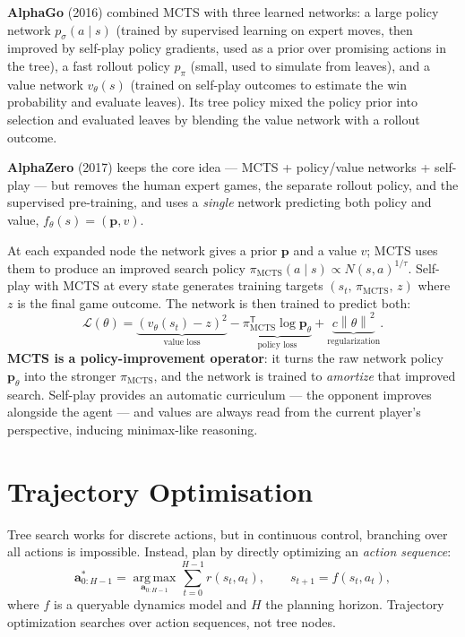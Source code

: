 \documentclass[11pt, oneside]{book}
\newcommand{\argmax}{\operatorname*{arg\,max}}
\newcommand{\norm}[1]{\left\lVert #1 \right\rVert}
\newcommand{\T}{^{\mathsf{T}}}           %
\newcommand{\loss}{\mathcal{L}}          %
\newcommand{\params}{\boldsymbol{\theta}}   %
\begin{document}
\textbf{AlphaGo} (2016) combined MCTS with three learned networks: a large policy network
$p_\sigma(a\mid s)$ (trained by supervised learning on expert moves, then improved by
self-play policy gradients, used as a prior over promising actions in the tree), a fast
rollout policy $p_\pi$ (small, used to simulate from leaves), and a value network
$v_\theta(s)$ (trained on self-play outcomes to estimate the win probability and evaluate
leaves). Its tree policy mixed the policy prior into selection and evaluated leaves by
blending the value network with a rollout outcome.

\textbf{AlphaZero} (2017) keeps the core idea --- MCTS + policy/value networks + self-play
--- but removes the human expert games, the separate rollout policy, and the supervised
pre-training, and uses a \emph{single} network predicting both policy and value,
$f_\theta(s) = (\mathbf{p}, v)$.

\begin{intbox}[title={Search improves the policy; learning amortizes search}]
At each expanded node the network gives a prior $\mathbf{p}$ and a value $v$; MCTS uses them
to produce an improved search policy $\pi_{\text{MCTS}}(a\mid s) \propto N(s,a)^{1/\tau}$.
Self-play with MCTS at every state generates training targets $(s_t,\, \pi_{\text{MCTS}},\, z)$
where $z$ is the final game outcome. The network is then trained to predict both:
\[
  \loss(\theta) = \underbrace{(v_\theta(s_t) - z)^2}_{\text{value loss}}
  - \underbrace{\pi_{\text{MCTS}}\T \log \mathbf{p}_\theta}_{\text{policy loss}}
  + \underbrace{c\norm{\theta}^2}_{\text{regularization}}.
\]
\textbf{MCTS is a policy-improvement operator}: it turns the raw network policy
$\mathbf{p}_\theta$ into the stronger $\pi_{\text{MCTS}}$, and the network is trained to
\emph{amortize} that improved search. Self-play provides an automatic curriculum --- the
opponent improves alongside the agent --- and values are always read from the current
player's perspective, inducing minimax-like reasoning.
\end{intbox}

\section{Trajectory Optimisation}

Tree search works for discrete actions, but in continuous control, branching over all
actions is impossible. Instead, plan by directly optimizing an \emph{action sequence}:
\[
  \mathbf{a}^*_{0:H-1} = \argmax_{\mathbf{a}_{0:H-1}} \sum_{t=0}^{H-1} r(s_t, a_t),
  \qquad s_{t+1} = f(s_t, a_t),
\]
where $f$ is a queryable dynamics model and $H$ the planning horizon. Trajectory
optimization searches over action sequences, not tree nodes.
\end{document}
